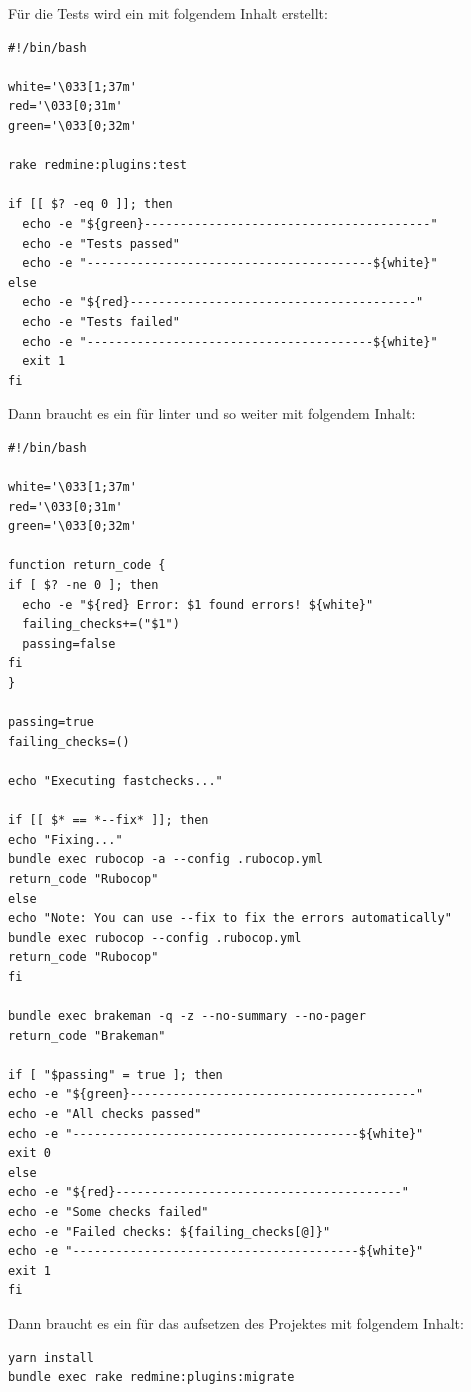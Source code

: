 Für die Tests wird ein  mit folgendem Inhalt erstellt:
\begin{codebox}[]
  \begin{verbatim}
#!/bin/bash

white='\033[1;37m'
red='\033[0;31m'
green='\033[0;32m'

rake redmine:plugins:test

if [[ $? -eq 0 ]]; then
  echo -e "${green}----------------------------------------"
  echo -e "Tests passed"
  echo -e "----------------------------------------${white}"
else
  echo -e "${red}----------------------------------------"
  echo -e "Tests failed"
  echo -e "----------------------------------------${white}"
  exit 1
fi
  \end{verbatim}
\end{codebox}

Dann braucht es ein  für linter und so weiter mit folgendem Inhalt:
\begin{codebox}[]
  \begin{verbatim}
#!/bin/bash

white='\033[1;37m'
red='\033[0;31m'
green='\033[0;32m'

function return_code {
if [ $? -ne 0 ]; then
  echo -e "${red} Error: $1 found errors! ${white}"
  failing_checks+=("$1")
  passing=false
fi
}

passing=true
failing_checks=()

echo "Executing fastchecks..."

if [[ $* == *--fix* ]]; then
echo "Fixing..."
bundle exec rubocop -a --config .rubocop.yml
return_code "Rubocop"
else 
echo "Note: You can use --fix to fix the errors automatically"
bundle exec rubocop --config .rubocop.yml
return_code "Rubocop"
fi

bundle exec brakeman -q -z --no-summary --no-pager
return_code "Brakeman"

if [ "$passing" = true ]; then
echo -e "${green}----------------------------------------"
echo -e "All checks passed"
echo -e "----------------------------------------${white}"
exit 0
else
echo -e "${red}----------------------------------------"
echo -e "Some checks failed"
echo -e "Failed checks: ${failing_checks[@]}"
echo -e "----------------------------------------${white}"
exit 1
fi
  \end{verbatim}
\end{codebox}

Dann braucht es ein  für das aufsetzen des Projektes mit folgendem Inhalt:
\begin{codebox}[]
  \begin{verbatim}
yarn install
bundle exec rake redmine:plugins:migrate
  \end{verbatim}
\end{codebox}


